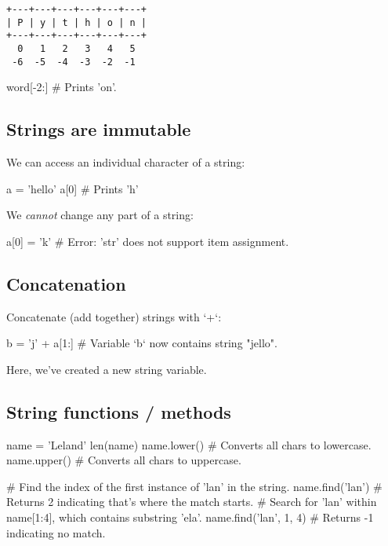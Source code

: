 \documentclass[12pt]{article} \newif\ifsolution\solutiontrue %
\begin{document}
\begin{verbatim}
+---+---+---+---+---+---+
| P | y | t | h | o | n |
+---+---+---+---+---+---+
  0   1   2   3   4   5
 -6  -5  -4  -3  -2  -1
\end{verbatim}

\begin{python}
word[-2:]  # Prints 'on'.
\end{python}

\subsection{Strings are immutable}

We can access an individual character of a string:

\begin{python}
a = 'hello'
a[0]  # Prints 'h'
\end{python}

We \emph{cannot} change any part of a string:

\begin{python}
a[0] = 'k'  # Error: 'str' does not support item assignment.
\end{python}

\subsection{Concatenation}
Concatenate (add together) strings with `+`:

\begin{python}
b = 'j' + a[1:]  # Variable `b` now contains string "jello".
\end{python}
Here, we've created a new string variable.

\subsection{String functions / methods}

\begin{python}
name = 'Leland'
len(name)
name.lower()  # Converts all chars to lowercase.
name.upper()  # Converts all chars to uppercase.

# Find the index of the first instance of 'lan' in the string.
name.find('lan')        # Returns 2 indicating that's where the match starts.
# Search for 'lan' within name[1:4], which contains substring 'ela'.
name.find('lan', 1, 4)  # Returns -1 indicating no match.
\end{python}
\end{document}
